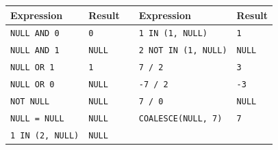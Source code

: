 \begin{tabular}{@{}llp{}ll@{}}\toprule
\textbf{Expression} & \textbf{Result} & & \textbf{Expression} & \textbf{Result}\\ \midrule
\texttt{NULL AND 0} & \texttt{0} & & \texttt{1 IN (1, NULL)} & \texttt{1}\\
\texttt{NULL AND 1} & \texttt{NULL} & & \texttt{2 NOT IN (1, NULL)} & \texttt{NULL}\\
\texttt{NULL OR 1} & \texttt{1} & & \texttt{7 / 2} & \texttt{3}\\
\texttt{NULL OR 0} & \texttt{NULL} & & \texttt{-7 / 2} & \texttt{-3}\\
\texttt{NOT NULL} & \texttt{NULL} & & \texttt{7 / 0} & \texttt{NULL}\\
\texttt{NULL = NULL} & \texttt{NULL} & & \texttt{COALESCE(NULL, 7)} & \texttt{7}\\
\texttt{1 IN (2, NULL)} & \texttt{NULL} & &  & \\
\bottomrule
\end{tabular}
